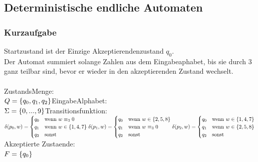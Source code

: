 \documentclass{article}
\begin{document}
\newpage
\subsection{Deterministische endliche Automaten}
\subsubsection{Kurzaufgabe}
Startzustand ist der Einzige Akzeptierendenzustand $q_0$.\\
Der Automat summiert solange Zahlen aus dem Eingabeaphabet, bis sie
durch 3 ganz teilbar sind, bevor er wieder in den akzeptierenden 
Zustand wechselt.\\
\\
ZustandsMenge:\\$
Q = \{q_0, q_1, q_2\}\\
\\
$EingabeAlphabet:\\$
\Sigma = \{0,...,9\}\\
\\
$Transitionsfunktion:\\$
\delta(p_0, w) =
\begin{cases}
    q_0&\text{wenn }w \equiv_3 0\\
    q_1&\text{wenn }w \in \{1,4,7\}\\
    q_2&\text{sonst}\\
\end{cases}\\
\delta(p_1, w) =
\begin{cases}
    q_0&\text{wenn }w \in \{2,5,8\}\\
    q_1&\text{wenn }w \equiv_3 0\\
    q_2&\text{sonst}\\
\end{cases}\\
\delta(p_2, w) =
\begin{cases}
    q_0&\text{wenn }w \in \{1,4,7\}\\
    q_1&\text{wenn }w\in \{2,5,8\}\\
    q_2&\text{sonst}\\
\end{cases}\\
\\
$Akzeptierte Zustaende:\\$
F = \{q_0\}\\
$
\end{document}
